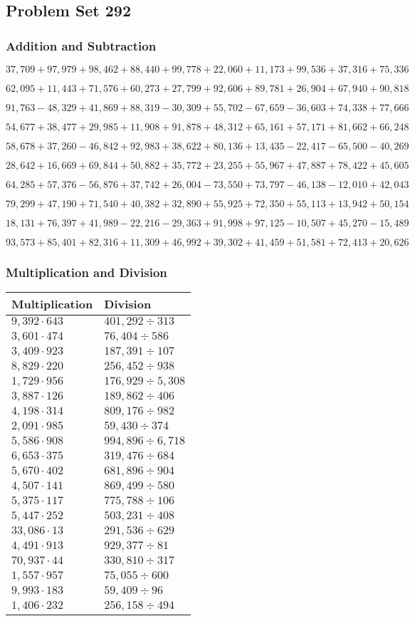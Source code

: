 \hypertarget{problem-set-292}{%
\subsection{Problem Set 292}\label{problem-set-292}}

\hypertarget{addition-and-subtraction}{%
\subsubsection{Addition and
Subtraction}\label{addition-and-subtraction}}

\(37,709+97,979+98,462+88,440+99,778+22,060+11,173+99,536+37,316+75,336\)

\(62,095+11,443+71,576+60,273+27,799+92,606+89,781+26,904+67,940+90,818\)

\(91,763-48,329+41,869+88,319-30,309+55,702-67,659-36,603+74,338+77,666\)

\(54,677+38,477+29,985+11,908+91,878+48,312+65,161+57,171+81,662+66,248\)

\(58,678+37,260-46,842+92,983+38,622+80,136+13,435-22,417-65,500-40,269\)

\(28,642+16,669+69,844+50,882+35,772+23,255+55,967+47,887+78,422+45,605\)

\(64,285+57,376-56,876+37,742+26,004-73,550+73,797-46,138-12,010+42,043\)

\(79,299+47,190+71,540+40,382+32,890+55,925+72,350+55,113+13,942+50,154\)

\(18,131+76,397+41,989-22,216-29,363+91,998+97,125-10,507+45,270-15,489\)

\(93,573+85,401+82,316+11,309+46,992+39,302+41,459+51,581+72,413+20,626\)

\hypertarget{multiplication-and-division}{%
\subsubsection{Multiplication and
Division}\label{multiplication-and-division}}

\begin{longtable}[]{@{}ll@{}}
\toprule
Multiplication & Division\tabularnewline
\midrule
\endhead
\(9,392\cdot643\) & \(401,292÷313\)\tabularnewline
\(3,601\cdot474\) & \(76,404÷586\)\tabularnewline
\(3,409\cdot923\) & \(187,391÷107\)\tabularnewline
\(8,829\cdot220\) & \(256,452÷938\)\tabularnewline
\(1,729\cdot956\) & \(176,929÷5,308\)\tabularnewline
\(3,887\cdot126\) & \(189,862÷406\)\tabularnewline
\(4,198\cdot314\) & \(809,176÷982\)\tabularnewline
\(2,091\cdot985\) & \(59,430÷374\)\tabularnewline
\(5,586\cdot908\) & \(994,896÷6,718\)\tabularnewline
\(6,653\cdot375\) & \(319,476÷684\)\tabularnewline
\(5,670\cdot402\) & \(681,896÷904\)\tabularnewline
\(4,507\cdot141\) & \(869,499÷580\)\tabularnewline
\(5,375\cdot117\) & \(775,788÷106\)\tabularnewline
\(5,447\cdot252\) & \(503,231÷408\)\tabularnewline
\(33,086\cdot13\) & \(291,536÷629\)\tabularnewline
\(4,491\cdot913\) & \(929,377÷81\)\tabularnewline
\(70,937\cdot44\) & \(330,810÷317\)\tabularnewline
\(1,557\cdot957\) & \(75,055÷600\)\tabularnewline
\(9,993\cdot183\) & \(59,409÷96\)\tabularnewline
\(1,406\cdot232\) & \(256,158÷494\)\tabularnewline
\bottomrule
\end{longtable}
